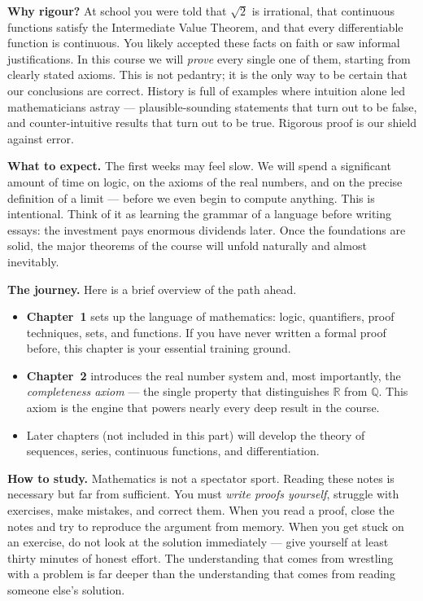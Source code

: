 \documentclass[12pt,a4paper,openany]{book}
\newcommand{\Q}{\mathbb{Q}}
\newcommand{\R}{\mathbb{R}}
\theoremstyle{definition}
\theoremstyle{remark}
\begin{document}
\medskip

\textbf{Why rigour?}\quad
At school you were told that $\sqrt{2}$ is irrational, that continuous
functions satisfy the Intermediate Value Theorem, and that every
differentiable function is continuous.  You likely accepted these facts on
faith or saw informal justifications.  In this course we will \emph{prove}
every single one of them, starting from clearly stated axioms.  This is not
pedantry; it is the only way to be certain that our conclusions are correct.
History is full of examples where intuition alone led mathematicians astray
--- plausible-sounding statements that turn out to be false, and
counter-intuitive results that turn out to be true.  Rigorous proof is our
shield against error.

\medskip

\textbf{What to expect.}\quad
The first weeks may feel slow.  We will spend a significant amount of time on
logic, on the axioms of the real numbers, and on the precise definition of a
limit --- before we even begin to compute anything.  This is intentional.
Think of it as learning the grammar of a language before writing essays: the
investment pays enormous dividends later.  Once the foundations are solid, the
major theorems of the course will unfold naturally and almost inevitably.

\medskip

\textbf{The journey.}\quad
Here is a brief overview of the path ahead.

\begin{itemize}[leftmargin=2em]
\item \textbf{Chapter~1} sets up the language of mathematics: logic,
  quantifiers, proof techniques, sets, and functions.  If you have never
  written a formal proof before, this chapter is your essential training
  ground.
\item \textbf{Chapter~2} introduces the real number system and, most
  importantly, the \emph{completeness axiom} --- the single property that
  distinguishes $\R$ from $\Q$.  This axiom is the engine that powers nearly
  every deep result in the course.
\item Later chapters (not included in this part) will develop the theory of
  sequences, series, continuous functions, and differentiation.
\end{itemize}

\textbf{How to study.}\quad
Mathematics is not a spectator sport.  Reading these notes is necessary but
far from sufficient.  You must \emph{write proofs yourself}, struggle with
exercises, make mistakes, and correct them.  When you read a proof, close
the notes and try to reproduce the argument from memory.  When you get stuck
on an exercise, do not look at the solution immediately --- give yourself at
least thirty minutes of honest effort.  The understanding that comes from
wrestling with a problem is far deeper than the understanding that comes
from reading someone else's solution.
\end{document}
